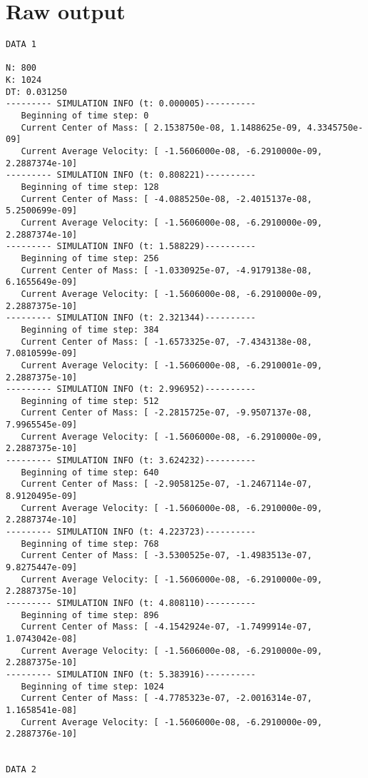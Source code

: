 \documentclass[11pt]{article}
\begin{document}
\section{Raw output}
\label{sec:orgc83aa73}

\begin{verbatim}
DATA 1

N: 800
K: 1024
DT: 0.031250
--------- SIMULATION INFO (t: 0.000005)----------
   Beginning of time step: 0
   Current Center of Mass: [ 2.1538750e-08, 1.1488625e-09, 4.3345750e-09]
   Current Average Velocity: [ -1.5606000e-08, -6.2910000e-09, 2.2887374e-10]
--------- SIMULATION INFO (t: 0.808221)----------
   Beginning of time step: 128
   Current Center of Mass: [ -4.0885250e-08, -2.4015137e-08, 5.2500699e-09]
   Current Average Velocity: [ -1.5606000e-08, -6.2910000e-09, 2.2887374e-10]
--------- SIMULATION INFO (t: 1.588229)----------
   Beginning of time step: 256
   Current Center of Mass: [ -1.0330925e-07, -4.9179138e-08, 6.1655649e-09]
   Current Average Velocity: [ -1.5606000e-08, -6.2910000e-09, 2.2887375e-10]
--------- SIMULATION INFO (t: 2.321344)----------
   Beginning of time step: 384
   Current Center of Mass: [ -1.6573325e-07, -7.4343138e-08, 7.0810599e-09]
   Current Average Velocity: [ -1.5606000e-08, -6.2910001e-09, 2.2887375e-10]
--------- SIMULATION INFO (t: 2.996952)----------
   Beginning of time step: 512
   Current Center of Mass: [ -2.2815725e-07, -9.9507137e-08, 7.9965545e-09]
   Current Average Velocity: [ -1.5606000e-08, -6.2910000e-09, 2.2887375e-10]
--------- SIMULATION INFO (t: 3.624232)----------
   Beginning of time step: 640
   Current Center of Mass: [ -2.9058125e-07, -1.2467114e-07, 8.9120495e-09]
   Current Average Velocity: [ -1.5606000e-08, -6.2910000e-09, 2.2887374e-10]
--------- SIMULATION INFO (t: 4.223723)----------
   Beginning of time step: 768
   Current Center of Mass: [ -3.5300525e-07, -1.4983513e-07, 9.8275447e-09]
   Current Average Velocity: [ -1.5606000e-08, -6.2910000e-09, 2.2887375e-10]
--------- SIMULATION INFO (t: 4.808110)----------
   Beginning of time step: 896
   Current Center of Mass: [ -4.1542924e-07, -1.7499914e-07, 1.0743042e-08]
   Current Average Velocity: [ -1.5606000e-08, -6.2910000e-09, 2.2887375e-10]
--------- SIMULATION INFO (t: 5.383916)----------
   Beginning of time step: 1024
   Current Center of Mass: [ -4.7785323e-07, -2.0016314e-07, 1.1658541e-08]
   Current Average Velocity: [ -1.5606000e-08, -6.2910000e-09, 2.2887376e-10]


DATA 2


\end{verbatim}
\end{document}

